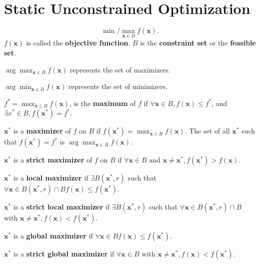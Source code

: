 \section{Static Unconstrained Optimization}

\begin{definition}
    \[
        \min / \max_{\mathbf{x} \in B} f(\mathbf{x}).
    \]
    $f(\mathbf{x})$ is called the \textbf{objective function}. $B$ is the \textbf{constraint set} or the \textbf{feasible set}.

    $\arg \max_{\mathbf{x} \in B} f(\mathbf{x})$ represents the set of maximizers.

    $\arg \min_{\mathbf{x} \in B} f(\mathbf{x})$ represents the set of minimizers.
\end{definition}

\begin{definition}
    $f ^{*} = \max_{\mathbf{x} \in B} f(\mathbf{x})$, is the \textbf{maximum} of $f$ if $\forall \mathbf{x} \in B, f(\mathbf{x}) \leq f^{*}$, and $\exists x^{*} \in B, f(\mathbf{x^{*}}) = f ^{*}$.

    $\mathbf{x ^{*}}$ is a \textbf{maximizer} of $f$ on $B$ if $f(\mathbf{x ^{*}}) = \max_{\mathbf{x} \in B}f(\mathbf{x})$. The set of all $\mathbf{x ^{*}}$ such that $f(\mathbf{x ^{*}}) = f ^{*}$ is $\arg \max_{\mathbf{x} \in B} f(\mathbf{x})$.

    $\mathbf{x ^{*}}$ is a \textbf{strict maximizer} of $f$ on $B$ if $\forall \mathbf{x} \in B \text{ and } \mathbf{x \neq x ^{*}}, f(\mathbf{x ^{*}}) > f(\mathbf{x})$.
\end{definition}

\begin{definition}
    \(\mathbf{x}^{*}\) is a \textbf{local maximizer} if \(\exists B(\mathbf{x}^{*}, r)\) such that \(\forall \mathbf{x} \in B(\mathbf{x}^{*}, r) \cap B f(\mathbf{x}) \leq f(\mathbf{x}^{*})\).

    \(\mathbf{x}^{*}\) is a \textbf{strict local maximizer} if \(\exists B(\mathbf{x}^{*}, r)\) such that \(\forall \mathbf{x} \in B(\mathbf{x}^{*}, r) \cap B\) with \(\mathbf{x} \neq \mathbf{x}^{*}, f(\mathbf{x}) < f(\mathbf{x}^{*})\).

    \(\mathbf{x}^{*}\) is a \textbf{global maximizer} if \(\forall \mathbf{x} \in B f(\mathbf{x}) \leq f(\mathbf{x}^{*})\).

    \(\mathbf{x}^{*}\) is a \textbf{strict global maximizer} if \(\forall \mathbf{x} \in B\) with \(\mathbf{x} \neq \mathbf{x}^{*}, f(\mathbf{x}) < f(\mathbf{x}^{*})\).
\end{definition}


